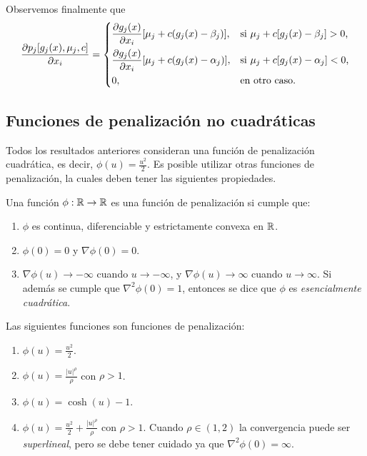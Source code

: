 Observemos finalmente que
\begin{equation*}
	\pdv{p_{j}[g_{j}(x), \mu_{j}, c]}{x_{i}} = \begin{dcases*}
		\pdv{g_{j}(x)}{x_{i}} [\mu_{j} + c (g_{j}(x) - \beta_{j})],		& si \(\mu_{j} + c[g_{j}(x) - \beta_{j}] > 0\),\\
		\pdv{g_{j}(x)}{x_{i}} [\mu_{j} + c (g_{j}(x) - \alpha_{j})],	& si \(\mu_{j} + c[g_{j}(x) - \alpha_{j}] < 0\),\\
		0, 																& en otro caso.
	\end{dcases*}
\end{equation*}

\subsection{Funciones de penalización no cuadráticas}

Todos los resultados anteriores consideran una función de penalización cuadrática, es decir, \(\phi(u) = \frac{u^{2}}{2}\). Es posible utilizar otras funciones de penalización, la cuales deben tener las siguientes propiedades.

\begin{definition}
	Una función \(\phi : \mathbb{R} \to \mathbb{R}\) es una función de penalización si cumple que:
	\begin{enumerate}
		\item \(\phi\) es continua, diferenciable y estrictamente convexa en \(\mathbb{R}\).
		\item \(\phi(0) = 0\) y \(\nabla \phi(0) = 0\).
		\item \(\nabla \phi(u) \to -\infty\) cuando \(u \to -\infty\), y \(\nabla \phi(u) \to \infty\) cuando \(u \to \infty\). Si además se cumple que \(\nabla^{2} \phi(0) = 1\), entonces se dice que \(\phi\) es \emph{esencialmente cuadrática}.
	\end{enumerate}
\end{definition}

\begin{proposition}
	Las siguientes funciones son funciones de penalización:
	\begin{enumerate}
		\item \(\phi(u) = \frac{u^{2}}{2}\).
		\item \(\phi(u) = \frac{\lvert u \rvert^{\rho}}{\rho}\) con \(\rho >1\).
		\item \(\phi(u) = \cosh(u) - 1\).
		\item \(\phi(u) = \frac{u^{2}}{2} + \frac{\lvert u \rvert^{\rho}}{\rho}\) con \(\rho > 1\). Cuando \(\rho \in (1, 2)\) la convergencia puede ser \emph{superlineal}, pero se debe tener cuidado ya que \(\nabla^{2} \phi(0) = \infty\).
	\end{enumerate}
\end{proposition}

